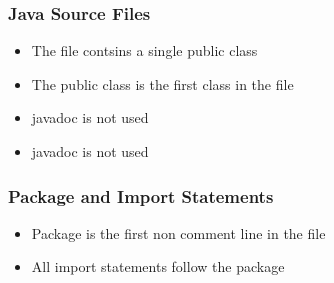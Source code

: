\subsubsection{Java Source Files}
\begin{itemize}
\item The file contsins  a single public class\\
\item The public class is the first class in the file\\
\item javadoc is not used
\item javadoc is not used
\end{itemize}


\subsubsection{Package and Import Statements}
\begin{itemize}
\item Package is the first non comment line in the file\\
\item All import statements follow the package\\ 
\end{itemize}



